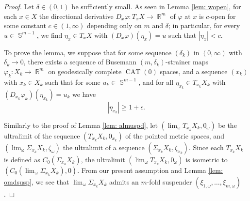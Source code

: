 \documentclass[a4paper,12pt]{amsart}
\newcommand{\CAT}{\operatorname{CAT}}
\newcommand{\ulim}{\operatorname{\lim_{\omega}}}
\newcommand{\R}{\operatorname{\mathbb{R}}}
\newcommand{\Sph}{\operatorname{\mathbb{S}}}
\numberwithin{equation}{section}
\theoremstyle{plain}
\theoremstyle{definition}
\theoremstyle{remark}
\begin{document}
\begin{proof}
Let $\delta \in (0,1)$ be sufficiently small.
As seen in Lemma \ref{lem: wopen},
for each $x \in X$ the directional derivative 
$D_x\varphi \colon T_xX \to \R^m$ of $\varphi$ at $x$
is $c$-open for some constant $c \in (1,\infty)$
depending only on $m$ and $\delta$;
in particular, 
for every $u \in \Sph^{m-1}$,
we find $\eta_x \in T_xX$ with 
$\left( D_x\varphi \right) \left( \eta_x \right) = u$
such that $\left\vert \eta_x \right\vert < c$.

To prove the lemma,
we suppose that for some sequence $(\delta_k)$ in $(0,\infty)$
with $\delta_k \to 0$,
there exists a sequence
of Busemann $(m,\delta_k)$-strainer maps
$\varphi_k \colon X_k \to \R^m$ on geodesically complete
$\CAT(0)$ spaces,
and a sequence $(x_k)$ with $x_k \in X_k$
such that
for some $u_k \in \Sph^{m-1}$, and
for all $\eta_{x_k} \in T_{x_k}X_k$ with 
$\left( D_{x_k}\varphi_k \right) \left( \eta_{x_k} \right) = u_k$
we have
\begin{equation}
\left\vert \eta_{x_k} \right\vert \ge 1+\epsilon.
\label{eqn: str1eopen1}
\end{equation}

Similarly to the proof of Lemma \ref{lem: almuspd},
let 
$\left( \ulim T_{x_k}X_k, 0_{\omega} \right)$
be the ultralimit of the sequence $\left( T_{x_k}X_k, 0_{x_k} \right)$
of the pointed metric spaces,
and 
$\left( \ulim \Sigma_{x_k}X_k, \zeta_{\omega} \right)$
the ultralimit of a sequence $\left( \Sigma_{x_k}X_k, \zeta_{x_k} \right)$.
Since each $T_{x_k}X_k$ is defined as
$C_0 \left( \Sigma_{x_k}X_k \right)$,
the ultralimit $\left( \ulim T_{x_k}X_k, 0_{\omega} \right)$
is isometric to $\left( C_0 \left( \ulim \Sigma_{x_k}X_k \right), 0 \right)$.
From our present assumption and Lemma \ref{lem: omdsusp},
we see that
$\ulim \Sigma_{x_k}X_k$ admits an $m$-fold suspender 
$\left( \xi_{1,\omega}, \dots, \xi_{m,\omega} \right)$.


\end{proof}
\end{document}
